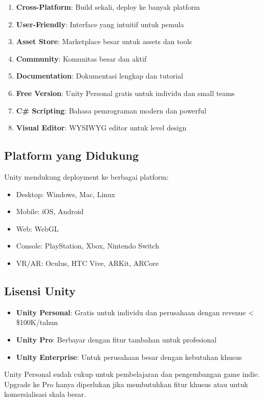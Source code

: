 \begin{enumerate}
\item \textbf{Cross-Platform}: Build sekali, deploy ke banyak platform
\item \textbf{User-Friendly}: Interface yang intuitif untuk pemula
\item \textbf{Asset Store}: Marketplace besar untuk assets dan tools
\item \textbf{Community}: Komunitas besar dan aktif
\item \textbf{Documentation}: Dokumentasi lengkap dan tutorial
\item \textbf{Free Version}: Unity Personal gratis untuk individu dan small teams
\item \textbf{C\# Scripting}: Bahasa pemrograman modern dan powerful
\item \textbf{Visual Editor}: WYSIWYG editor untuk level design
\end{enumerate}

\subsection{Platform yang Didukung}

Unity mendukung deployment ke berbagai platform:
\begin{itemize}
\item Desktop: Windows, Mac, Linux
\item Mobile: iOS, Android
\item Web: WebGL
\item Console: PlayStation, Xbox, Nintendo Switch
\item VR/AR: Oculus, HTC Vive, ARKit, ARCore
\end{itemize}

\subsection{Lisensi Unity}

\begin{itemize}
\item \textbf{Unity Personal}: Gratis untuk individu dan perusahaan dengan revenue < \$100K/tahun
\item \textbf{Unity Pro}: Berbayar dengan fitur tambahan untuk profesional
\item \textbf{Unity Enterprise}: Untuk perusahaan besar dengan kebutuhan khusus
\end{itemize}

\begin{catatan}
Unity Personal sudah cukup untuk pembelajaran dan pengembangan game indie. Upgrade ke Pro hanya diperlukan jika membutuhkan fitur khusus atau untuk komersialisasi skala besar.
\end{catatan}
